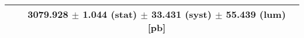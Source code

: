 \begin{tabular}{lc}
\hline
                               & 3079.928 $\pm$ 1.044 (stat) $\pm$ 33.431 (syst) $\pm$ 55.439 (lum) [pb]  \\
\hline
\end{tabular}

